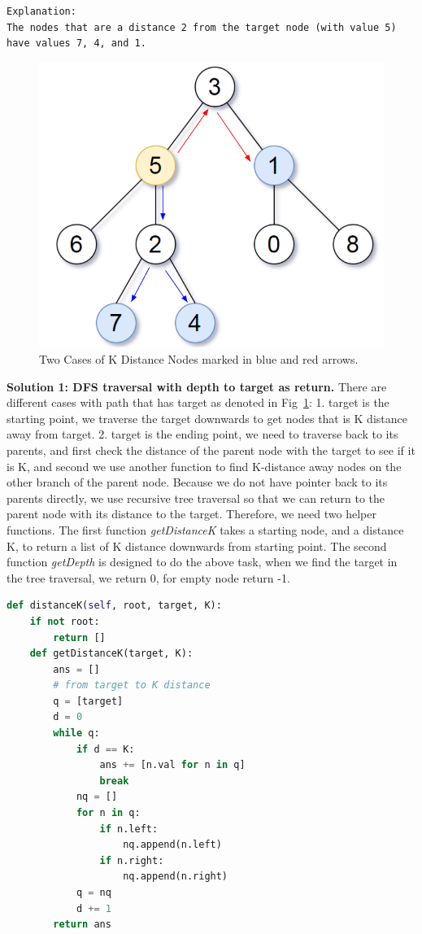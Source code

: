 \documentclass[../main.tex]{subfiles}
\begin{document}
\begin{examples}[resume]
\begin{lstlisting}[numbers=none]
Explanation: 
The nodes that are a distance 2 from the target node (with value 5)
have values 7, 4, and 1.
\end{lstlisting}
\begin{figure}
    \centering
    \includegraphics[width=0.7\columnwidth]{fig/example_863.png}
    \caption{Two Cases of K Distance Nodes marked in blue and red arrows. }
    \label{fig:distance_k}
\end{figure}
\textbf{Solution 1: DFS traversal with depth to target as return.} There are different cases with path that has target as denoted in Fig~\ref{fig:distance_k}: 1. target is the starting point, we traverse the target downwards to get nodes that is K distance away from target. 2. target is the ending point, we need to traverse back to its parents, and first check the distance of the parent node with the target to see if it is K, and second we use another function to find K-distance away nodes on the other branch of the parent node. Because we do not have pointer back to its parents directly, we use recursive tree traversal so that we can return to the parent node with its distance to the target. Therefore, we need two helper functions. The first function \textit{getDistanceK} takes a starting node, and a distance K, to return a list of K distance downwards from starting point. The second function \textit{getDepth} is designed to do the above task, when we find the target in the tree traversal, we return 0, for empty node return -1. 
\begin{lstlisting}[language=Python]
def distanceK(self, root, target, K):
    if not root:
        return []
    def getDistanceK(target, K):
        ans = []
        # from target to K distance
        q = [target]
        d = 0
        while q: 
            if d == K:
                ans += [n.val for n in q]
                break
            nq = []
            for n in q:
                if n.left:
                    nq.append(n.left)
                if n.right:
                    nq.append(n.right)
            q = nq
            d += 1
        return ans
        

\end{lstlisting}
\end{examples}
\end{document}
